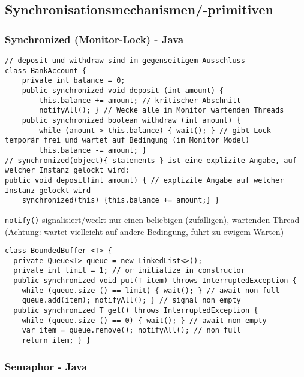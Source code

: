 \subsection{Synchronisationsmechanismen/-primitiven}

\subsubsection{Synchronized (Monitor-Lock) - Java}

\begin{lstlisting}
// deposit und withdraw sind im gegenseitigem Ausschluss
class BankAccount {
    private int balance = 0;
    public synchronized void deposit (int amount) {
        this.balance += amount; // kritischer Abschnitt
        notifyAll(); } // Wecke alle im Monitor wartenden Threads
    public synchronized boolean withdraw (int amount) {
        while (amount > this.balance) { wait(); } // gibt Lock temporär frei und wartet auf Bedingung (im Monitor Model)
        this.balance -= amount; }
// synchronized(object){ statements } ist eine explizite Angabe, auf welcher Instanz gelockt wird:
public void deposit(int amount) { // explizite Angabe auf welcher Instanz gelockt wird
    synchronized(this) {this.balance += amount;} }
\end{lstlisting}

\lstinline{notify()} signalisiert/weckt nur einen beliebigen (zufälligen), wartenden Thread (Achtung: wartet vielleicht auf andere Bedingung, führt zu ewigem Warten)

\begin{lstlisting}
class BoundedBuffer <T> {
  private Queue<T> queue = new LinkedList<>();
  private int limit = 1; // or initialize in constructor
  public synchronized void put(T item) throws InterruptedException {
    while (queue.size () == limit) { wait(); } // await non full
    queue.add(item); notifyAll(); } // signal non empty
  public synchronized T get() throws InterruptedException {
    while (queue.size () == 0) { wait(); } // await non empty
    var item = queue.remove(); notifyAll(); // non full
    return item; } }
\end{lstlisting}

\subsubsection{Semaphor - Java}

